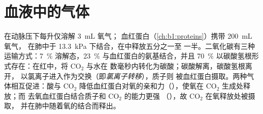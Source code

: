 \section{血液中的气体}

\begin{proposition}[氧气与二氧化碳的运输]\label{prop:b1:gas-exchange:transport}
在动脉压下每升仅溶解 \qty{3}{mL} 氧气；
血红蛋白（\cref{ch:b1:proteins}）携带 \qty{200}{mL} 氧气，
在肺中于 \qty{13.3}{kPa} 下结合，在中释放五分之一至
一半。二氧化碳有三种运输方式：\qty{7}{\%}
溶解态，\qty{23}{\%} 与血红蛋白的氨基结合，并且
\qty{70}{\%} 以碳酸氢根形式存在：在红中，\emph{}将 $\mathrm{CO_2}$ 与水在
数毫秒内转化为碳酸；碳酸解离，碳酸氢根离开，
以氯离子进入作为交换（即\emph{氯离子转移}），质子则
被血红蛋白摄取。两种气体相互促进：酸与
$\mathrm{CO_2}$ 降低血红蛋白对氧的亲和力（\emph{}），使氧在 $\mathrm{CO_2}$ 生成处释放；而
去氧血红蛋白结合质子和 $\mathrm{CO_2}$ 的能力更强
（\emph{}），故 $\mathrm{CO_2}$ 在氧释放处被摄取，
并在肺中随着氧的结合而释出。
\end{proposition}

